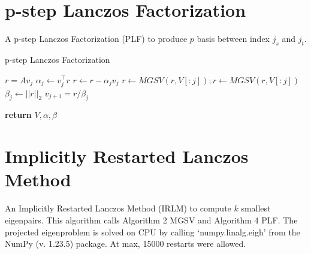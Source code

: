\documentclass[a4paper]{article}
\begin{document}
\section{p-step Lanczos Factorization}
A p-step Lanczos Factorization (PLF) to produce $p$ basis between index $j_s$ and $j_t$. 

\begin{algorithm}
\caption{p-step Lanczos Factorization}\label{alg:PLF}
\begin{algorithmic}[1]


    \State $r = Av_j$
    \State $\alpha_j \gets v_j^\top r  $
    \State $r \gets r - \alpha_j v_j $
    \State $r \gets MGSV(r,V[:j]); r \gets MGSV(r,V[:j])$ 
    \State $\beta_j \gets ||r||_2  $
    \State $v_{j+1} = r / \beta_j$
\EndFor


\State \textbf{return} $V, \alpha, \beta$

\EndProcedure
\end{algorithmic}
\end{algorithm}



\pagebreak





\section{Implicitly Restarted Lanczos Method}
An Implicitly Restarted Lanczos Method (IRLM) to compute $k$ smallest eigenpairs. This algorithm calls Algorithm 2 MGSV and Algorithm 4 PLF. The projected eigenproblem is solved on CPU by calling ‘numpy.linalg.eigh’ from the NumPy (v. 1.23.5) package. At max, 15000 restarts were allowed.
\end{document}
